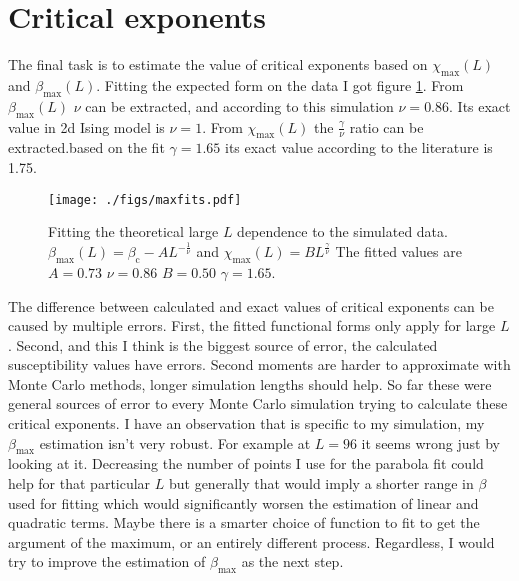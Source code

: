 \documentclass[pdftex,12pt,a4paper]{article}
\begin{document}
\section{Critical exponents}

The final task is to estimate the value of critical exponents based on $\chi_{\mathrm{max}}(L)$ and $\beta_{\mathrm{max}}(L)$. Fitting the expected form on the data I got figure \ref{maxfits}. From $\beta_{\mathrm{max}}(L)$ $\nu$ can be extracted, and according to this simulation $\nu=0.86$. Its exact value in 2d Ising model is $\nu=1$. From $\chi_{\mathrm{max}}(L)$ the $\frac{\gamma}{\nu}$ ratio can be extracted.based on the fit $\gamma=1.65$ its exact value according to the literature is 1.75.

\begin{figure}[H]
	\centering
	\texttt{[image: ./figs/maxfits.pdf]}
	\caption{Fitting the theoretical large $L$ dependence to the simulated data. $\beta_{\mathrm{max}}(L) = \beta_{\mathrm{c}} - AL^{-\frac{1}{\nu}}$ and $\chi_{\mathrm{max}}(L) = BL^{\frac{\gamma}{\nu}}$ The fitted values are $A=0.73$ $\nu=0.86$ $B=0.50$ $\gamma=1.65$.}
	\label{maxfits}
\end{figure}

The difference between calculated and exact values of critical exponents can be caused by multiple errors. First, the fitted functional forms only apply for large $L$. Second, and this I think is the biggest source of error, the calculated susceptibility values have errors. Second moments are harder to approximate with Monte Carlo methods, longer simulation lengths should help. So far these were general sources of error to every Monte Carlo simulation trying to calculate these critical exponents. I have an observation that is specific to my simulation, my $\beta_{\mathrm{max}}$ estimation isn't very robust. For example at $L=96$ it seems wrong just by looking at it. Decreasing the number of points I use for the parabola fit could help for that particular $L$ but generally that would imply a shorter range in $\beta$ used for fitting which would significantly worsen the estimation of linear and quadratic terms. Maybe there is a smarter choice of function to fit to get the argument of the maximum, or an entirely different process. Regardless, I would try to improve the estimation of $\beta_{\mathrm{max}}$ as the next step.
\end{document}
